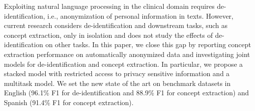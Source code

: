 Exploiting natural language processing in the clinical domain requires de-identification, i.e., anonymization of personal information in texts. However, current research considers de-identification and downstream tasks, such as concept extraction, only in isolation and does not study the effects of de-identification on other tasks. In this paper, we close this gap by reporting concept extraction performance on automatically anonymized data and investigating joint models for de-identification and concept extraction. In particular, we propose a stacked model with restricted access to privacy sensitive information and a multitask model. We set the new state of the art on benchmark datasets in English (96.1\% F1 for de-identification and 88.9\% F1 for concept extraction) and Spanish (91.4\% F1 for concept extraction).
